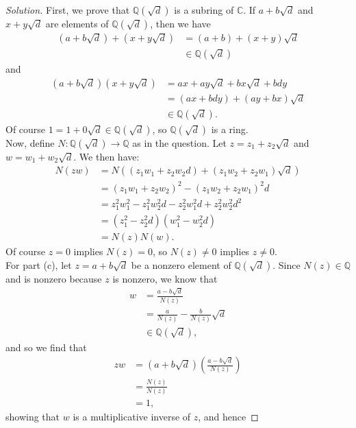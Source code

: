 \documentclass[12pt]{article}
\newenvironment{solution}
  {\renewcommand\qedsymbol{$\blacksquare$}\begin{proof}[Solution]}
{\end{proof}}
\theoremstyle{remark}
\begin{document}
\begin{solution}
  First, we prove that $\mathbb{Q}(\sqrt{d})$ is a subring of $\mathbb{C}$.
  If $a+b\sqrt{d}$ and $x+y\sqrt{d}$ are elements of $\mathbb{Q}(\sqrt{d})$,
  then we have
  \begin{align*}
    (a+b\sqrt{d}) + (x+y\sqrt{d}) &= (a+b) + (x+y)\sqrt{d} \\
    &\in \mathbb{Q}(\sqrt{d})
  \end{align*}
  and
  \begin{align*}
    (a+b\sqrt{d})(x+y\sqrt{d}) &= ax + ay\sqrt{d} + bx\sqrt{d} + bdy \\
    &= (ax+bdy) + (ay+bx)\sqrt{d} \\
    &\in \mathbb{Q}(\sqrt{d}).
  \end{align*}
  Of course $1 = 1 + 0\sqrt{d}\in\mathbb{Q}(\sqrt{d})$, so 
  $\mathbb{Q}(\sqrt{d})$ is a ring. \\
  \indent Now, define $N : \mathbb{Q}(\sqrt{d})\to \mathbb{Q}$ as
  in the question.
  Let $z=z_1+z_2\sqrt{d}$ and $w=w_1+w_2\sqrt{d}$.
  We then have:
  \begin{align*}
    N(zw) &= N( (z_1w_1 + z_2w_2d) + (z_1w_2+z_2w_1)\sqrt{d}) \\
    &= (z_1w_1 + z_2w_2)^2 - (z_1w_2 + z_2w_1)^2d \\
    &= z_1^2w_1^2 - z_1^2w_2^2d - z_2^2w_1^2d + z_2^2w_2^2d^2 \\
    &= (z_1^2 - z_2^2d)(w_1^2-w_2^2d) \\
    &= N(z)N(w).
  \end{align*}
  Of course $z=0$ implies $N(z)=0$, so $N(z)\neq 0$ implies $z\neq0$. \\
  \indent For part (c), let $z = a+b\sqrt{d}$ be a nonzero element of 
  $\mathbb{Q}(\sqrt{d})$.
  Since $N(z)\in\mathbb{Q}$ and is nonzero because $z$ is nonzero, 
  we know that 
  \begin{align*}
    w &=  \frac{a-b\sqrt{d}}{N(z)} \\
    &= \frac{a}{N(z)} - \frac{b}{N(z)}\sqrt{d}\\
    &\in\mathbb{Q}(\sqrt{d}),
  \end{align*}
  and so we find that
  \begin{align*}
    zw &= \left(a+b\sqrt{d}\right)\left(\frac{a-b\sqrt{d}}{N(z)}\right) \\
    &= \frac{N(z)}{N(z)} \\
    &= 1,
  \end{align*}
  showing that $w$ is a multiplicative inverse of $z$, and hence

\end{solution}
\end{document}
